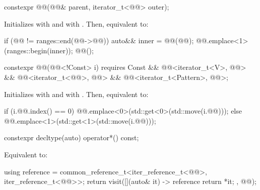 \begin{itemdecl}
constexpr @@(@@& parent, iterator_t<@@> outer);
\end{itemdecl}

\begin{itemdescr}
\pnum
\effects
Initializes  with  and
 with .
Then, equivalent to:
\begin{codeblock}
if (@@ != ranges::end(@@->@@)) {
  auto&& inner = @@(@@);
  @@.emplace<1>(ranges::begin(inner));
  @@();
}
\end{codeblock}
\end{itemdescr}

\begin{itemdecl}
constexpr @@(@@<!Const> i)
    requires Const && @@<iterator_t<V>, @@> &&
             @@<iterator_t<@@>, @@> &&
             @@<iterator_t<Pattern>, @@>;
\end{itemdecl}

\begin{itemdescr}
\pnum
\effects
Initializes  with
 and
 with .
Then, equivalent to:
\begin{codeblock}
if (i.@@.index() == 0)
  @@.emplace<0>(std::get<0>(std::move(i.@@)));
else
  @@.emplace<1>(std::get<1>(std::move(i.@@)));
\end{codeblock}
\end{itemdescr}

\begin{itemdecl}
constexpr decltype(auto) operator*() const;
\end{itemdecl}

\begin{itemdescr}
\pnum
\effects
Equivalent to:
\begin{codeblock}
using reference =
  common_reference_t<iter_reference_t<@@>, iter_reference_t<@@>>;
return visit([](auto& it) -> reference { return *it; }, @@);
\end{codeblock}
\end{itemdescr}

